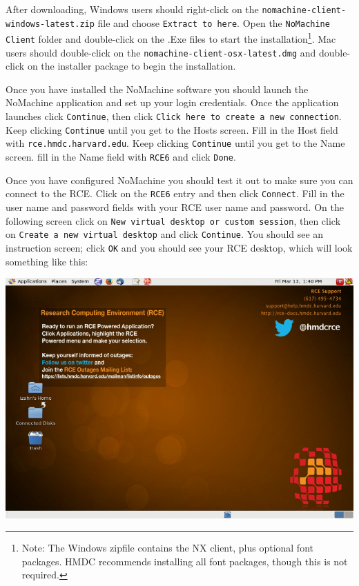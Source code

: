 \documentclass[11pt]{article}
\begin{document}
After downloading, Windows users should right-click on the \texttt{nomachine-client-windows-latest.zip} file and choose \texttt{Extract to here}. Open the \texttt{NoMachine Client} folder and double-click on the .Exe files to start the installation\footnote{Note: The Windows zipfile contains the NX client, plus optional font packages. HMDC recommends installing all font packages, though this is not required.}. Mac users should double-click on the \texttt{nomachine-client-osx-latest.dmg} and double-click on the installer package to begin the installation.

Once you have installed the NoMachine software you should launch the NoMachine application and set up your login credentials. Once the application launches click \texttt{Continue}, then click \texttt{Click here to create a new connection}. Keep clicking \texttt{Continue} until you get to the Hosts screen. Fill in the Host field with \texttt{rce.hmdc.harvard.edu}. Keep clicking \texttt{Continue} until you get to the Name screen. fill in the Name field with \texttt{RCE6} and click \texttt{Done}.

Once you have configured NoMachine you should test it out to make sure you can connect to the RCE. Click on the \texttt{RCE6} entry and then click \texttt{Connect}. Fill in the user name and password fields with your RCE user name and password. On the following screen click on \texttt{New virtual desktop or custom session}, then click on \texttt{Create a new virtual desktop} and click \texttt{Continue}. You should see an instruction screen; click \texttt{OK} and you should see your RCE desktop, which will look something like this:

\includegraphics[width=.9\linewidth]{images/rceDesktop.png}
\end{document}
